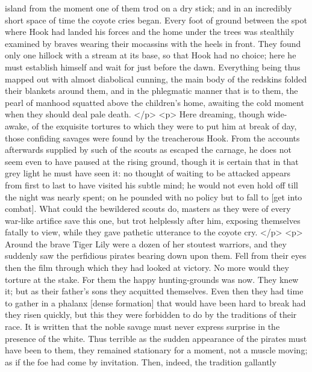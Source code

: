       island from the moment one of them trod on a dry stick; and in an
      incredibly short space of time the coyote cries began. Every foot of
      ground between the spot where Hook had landed his forces and the home
      under the trees was stealthily examined by braves wearing their mocassins
      with the heels in front. They found only one hillock with a stream at its
      base, so that Hook had no choice; here he must establish himself and wait
      for just before the dawn. Everything being thus mapped out with almost
      diabolical cunning, the main body of the redskins folded their blankets
      around them, and in the phlegmatic manner that is to them, the pearl of
      manhood squatted above the children's home, awaiting the cold moment when
      they should deal pale death.
    </p>
    <p>
      Here dreaming, though wide-awake, of the exquisite tortures to which they
      were to put him at break of day, those confiding savages were found by the
      treacherous Hook. From the accounts afterwards supplied by such of the
      scouts as escaped the carnage, he does not seem even to have paused at the
      rising ground, though it is certain that in that grey light he must have
      seen it: no thought of waiting to be attacked appears from first to last
      to have visited his subtle mind; he would not even hold off till the night
      was nearly spent; on he pounded with no policy but to fall to [get into
      combat]. What could the bewildered scouts do, masters as they were of
      every war-like artifice save this one, but trot helplessly after him,
      exposing themselves fatally to view, while they gave pathetic utterance to
      the coyote cry.
    </p>
    <p>
      Around the brave Tiger Lily were a dozen of her stoutest warriors, and
      they suddenly saw the perfidious pirates bearing down upon them. Fell from
      their eyes then the film through which they had looked at victory. No more
      would they torture at the stake. For them the happy hunting-grounds was
      now. They knew it; but as their father's sons they acquitted themselves.
      Even then they had time to gather in a phalanx [dense formation] that
      would have been hard to break had they risen quickly, but this they were
      forbidden to do by the traditions of their race. It is written that the
      noble savage must never express surprise in the presence of the white.
      Thus terrible as the sudden appearance of the pirates must have been to
      them, they remained stationary for a moment, not a muscle moving; as if
      the foe had come by invitation. Then, indeed, the tradition gallantly
